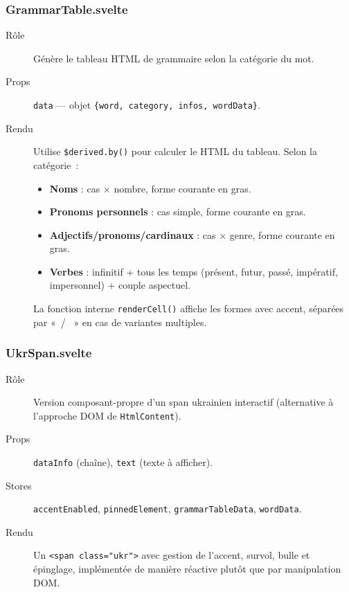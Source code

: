 \subsubsection{GrammarTable.svelte}

\begin{description}
  \item[Rôle] Génère le tableau HTML de grammaire selon la catégorie du mot.
  \item[Props] \texttt{data} --- objet \texttt{\{word, category, infos, wordData\}}.
  \item[Rendu] Utilise \texttt{\$derived.by()} pour calculer le HTML du tableau. Selon la catégorie~:
  \begin{itemize}
    \item \textbf{Noms} : cas $\times$ nombre, forme courante en gras.
    \item \textbf{Pronoms personnels} : cas simple, forme courante en gras.
    \item \textbf{Adjectifs/pronoms/cardinaux} : cas $\times$ genre, forme courante en gras.
    \item \textbf{Verbes} : infinitif + tous les temps (présent, futur, passé, impératif, impersonnel) + couple aspectuel.
  \end{itemize}
  La fonction interne \texttt{renderCell()} affiche les formes avec accent, séparées par «~/ ~» en cas de variantes multiples.
\end{description}

\subsubsection{UkrSpan.svelte}

\begin{description}
  \item[Rôle] Version composant-propre d'un span ukrainien interactif (alternative à l'approche DOM de \texttt{HtmlContent}).
  \item[Props] \texttt{dataInfo} (chaîne), \texttt{text} (texte à afficher).
  \item[Stores] \texttt{accentEnabled}, \texttt{pinnedElement}, \texttt{grammarTableData}, \texttt{wordData}.
  \item[Rendu] Un \texttt{<span class="ukr">} avec gestion de l'accent, survol, bulle et épinglage, implémentée de manière réactive plutôt que par manipulation DOM.
\end{description}

